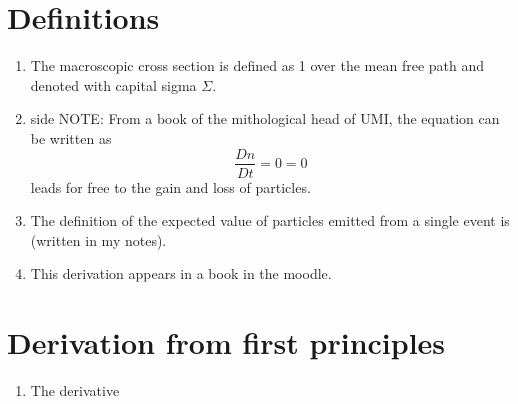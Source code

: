 \documentclass[11pt]{article}
\begin{document}
\section{Definitions}
    \begin{enumerate}
        \item The macroscopic cross section is defined as 1 over the mean free path and denoted with capital sigma $\Sigma$.
        \item side NOTE: From a book of the mithological head of UMI, the equation can be written as 
        \begin{equation}
            \frac{Dn}{Dt} = 0 = 0
        \end{equation}
        leads for free to the gain and loss of particles.
        \item The definition of the expected value of particles emitted from a single event is (written in my notes).
        \item This derivation appears in a book in the moodle.
    \end{enumerate}

\section{Derivation from first principles}
\begin{enumerate}
    \item The derivative
\end{enumerate}
\end{document}
